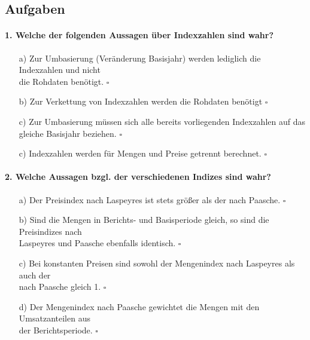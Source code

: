 \documentclass[a4paper]{article}
\begin{document}
\clearpage

\subsection{Aufgaben}

\paragraph{1. Welche der folgenden Aussagen über Indexzahlen sind wahr?}

\begin{itemize}
    \item[a)] Zur Umbasierung (Veränderung Basisjahr) werden lediglich die Indexzahlen und nicht\\die Rohdaten benötigt. \hfill $\square$
    \item[b)] Zur Verkettung von Indexzahlen werden die Rohdaten benötigt \hfill $\square$
    \item[c)] Zur Umbasierung müssen sich alle bereits vorliegenden Indexzahlen auf das\\gleiche Basisjahr beziehen. \hfill $\square$
    \item[c)] Indexzahlen werden für Mengen und Preise getrennt berechnet. \hfill $\square$
\end{itemize}

\paragraph{2. Welche Aussagen bzgl. der verschiedenen Indizes sind wahr?}

\begin{itemize}
    \item[a)] Der Preisindex nach Laspeyres ist stets größer als der nach Paasche. \hfill $\square$
    \item[b)] Sind die Mengen in Berichts- und Basisperiode gleich, so sind die Preisindizes nach\\Laspeyres und Paasche ebenfalls identisch. \hfill $\square$
    \item[c)] Bei konstanten Preisen sind sowohl der Mengenindex nach Laspeyres als auch der\\nach Paasche gleich 1. \hfill $\square$
    \item[d)] Der Mengenindex nach Paasche gewichtet die Mengen mit den Umsatzanteilen aus\\der Berichtsperiode. \hfill $\square$
\end{itemize}
\end{document}
